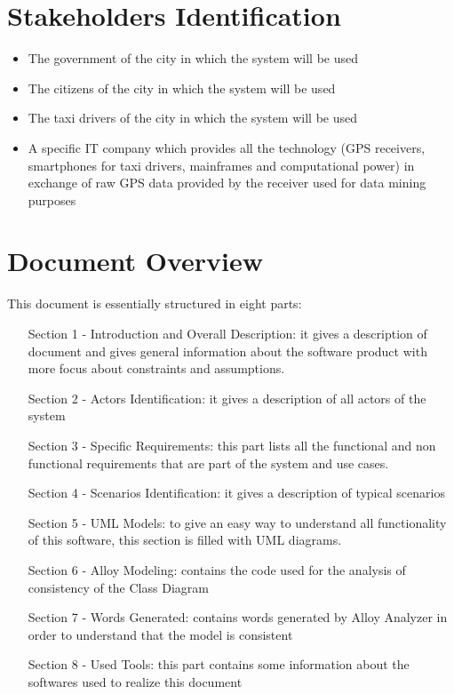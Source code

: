 \section{Stakeholders Identification}
\begin{itemize}
	\item The government of the city in which the system will be used
	\item The citizens of the city in which the system will be used
	\item The taxi drivers of the city in which the system will be used
	\item A specific IT company which provides all the technology (GPS receivers, smartphones for taxi drivers, mainframes and computational power) in exchange of raw GPS data provided by the receiver used for data mining purposes
\end{itemize}

\section{Document Overview}
This document is essentially structured in eight parts:
\begin{itemize}
	\item [Section 1 -] Introduction and Overall Description: it gives a description of document and  gives general information about the software product with more focus about constraints and assumptions.
	\item [Section 2 -] Actors Identification: it gives a description of all actors of the system 
	\item [Section 3 -] Specific Requirements: this part lists all the functional and non functional requirements that are part of the system and use cases.
	\item [Section 4 -] Scenarios Identification: it gives a description of typical scenarios
	\item [Section 5 -] UML Models: to give an easy way to understand all functionality of this software, this section is filled with UML diagrams.
	\item [Section 6 -] Alloy Modeling: contains the code used for the analysis of consistency of the Class Diagram
	\item [Section 7 -] Words Generated: contains words generated by Alloy Analyzer in order to understand that the model is consistent
	\item [Section 8 -] Used Tools: this part contains some information about the softwares used to realize this document
\end{itemize}

